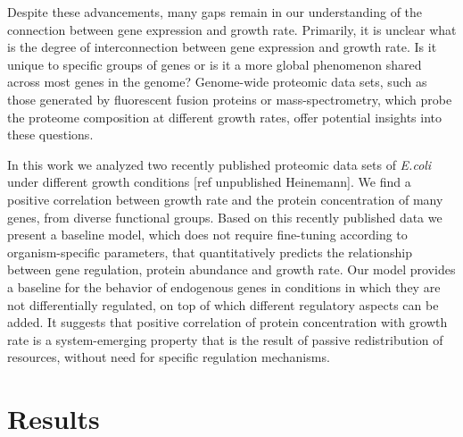 \documentclass[notitlepage]{article}
\begin{document}
Despite these advancements, many gaps remain in our understanding of the connection between gene expression and growth rate.
Primarily, it is unclear what is the degree of interconnection between gene expression and growth rate.
Is it unique to specific groups of genes or is it a more global phenomenon shared across most genes in the genome?
Genome-wide proteomic data sets, such as those generated by fluorescent fusion proteins or mass-spectrometry, which probe the proteome composition at different growth rates, offer potential insights into these questions.

In this work we analyzed two recently published proteomic data sets of \emph{E.coli} under different growth conditions \parencite{Valgepea2013} [ref unpublished Heinemann].
We find a positive correlation between growth rate and the protein concentration of many genes, from diverse functional groups.
Based on this recently published data we present a baseline model, which does not require fine-tuning according to organism-specific parameters, that quantitatively predicts the relationship between gene regulation, protein abundance and growth rate.
Our model provides a baseline for the behavior of endogenous genes in conditions in which they are not differentially regulated, on top of which different regulatory aspects can be added.
It suggests that positive correlation of protein concentration with growth rate is a system-emerging property that is the result of passive redistribution of resources, without need for specific regulation mechanisms.

\section{Results}
\end{document}
